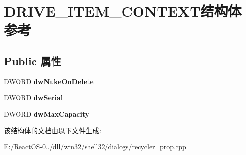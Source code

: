 \hypertarget{struct_d_r_i_v_e___i_t_e_m___c_o_n_t_e_x_t}{}\section{D\+R\+I\+V\+E\+\_\+\+I\+T\+E\+M\+\_\+\+C\+O\+N\+T\+E\+X\+T结构体 参考}
\label{struct_d_r_i_v_e___i_t_e_m___c_o_n_t_e_x_t}
\subsection*{Public 属性}
\begin{DoxyCompactItemize}
\item 
\mbox{\label{struct_d_r_i_v_e___i_t_e_m___c_o_n_t_e_x_t_a0c4e0a9ea79117673d5a33079439e3c6}} 
D\+W\+O\+RD {\bfseries dw\+Nuke\+On\+Delete}
\item 
\mbox{\label{struct_d_r_i_v_e___i_t_e_m___c_o_n_t_e_x_t_aef551155764002117b8ab85a38a1ed7a}} 
D\+W\+O\+RD {\bfseries dw\+Serial}
\item 
\mbox{\label{struct_d_r_i_v_e___i_t_e_m___c_o_n_t_e_x_t_a5baa95deb6d121549de5beb39c11d733}} 
D\+W\+O\+RD {\bfseries dw\+Max\+Capacity}
\end{DoxyCompactItemize}


该结构体的文档由以下文件生成\+:\begin{DoxyCompactItemize}
\item 
E\+:/\+React\+O\+S-\/0../dll/win32/shell32/dialogs/recycler\+\_\+prop.\+cpp\end{DoxyCompactItemize}
